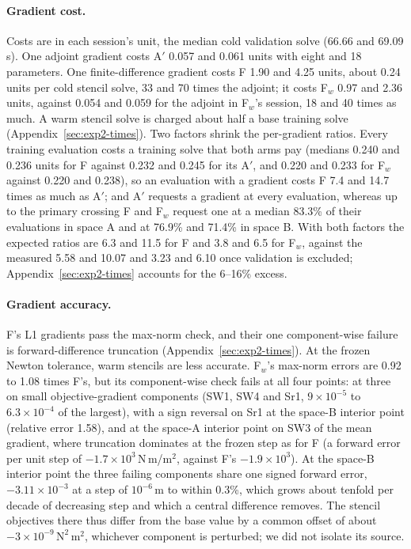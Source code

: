 \paragraph{Gradient cost.}
Costs are in each session's unit, the median cold validation solve (66.66
and 69.09\,s). One adjoint gradient costs A$'$ 0.057 and 0.061 units with
eight and 18 parameters. One finite-difference gradient costs F 1.90 and
4.25 units, about 0.24 units per cold stencil solve, 33 and 70 times the
adjoint; it costs F$_w$ 0.97 and 2.36 units, against 0.054 and 0.059 for
the adjoint in F$_w$'s session, 18 and 40 times as much. A warm
stencil solve is charged about half a base training solve
(Appendix~\ref{sec:exp2-times}). Two factors shrink the per-gradient ratios. Every training
evaluation costs a training solve that both arms pay (medians 0.240 and
0.236 units for F against 0.232 and 0.245 for its A$'$, and 0.220 and
0.233 for F$_w$ against 0.220 and 0.238), so an evaluation with a gradient
costs F 7.4 and 14.7 times as much as A$'$;
and A$'$ requests a gradient at every evaluation, whereas up to the primary
crossing F and F$_w$ request one at a median 83.3\% of their evaluations
in space A and at 76.9\% and 71.4\% in space B. With both factors the expected
ratios are 6.3 and 11.5 for F and 3.8 and 6.5 for F$_w$, against the
measured 5.58 and 10.07 and 3.23 and 6.10 once validation is excluded;
Appendix~\ref{sec:exp2-times} accounts for the 6--16\% excess.

\paragraph{Gradient accuracy.}
F's L1 gradients pass the max-norm check, and their one component-wise
failure is forward-difference truncation (Appendix~\ref{sec:exp2-times}).
At the frozen Newton tolerance, warm stencils
are less accurate. F$_w$'s max-norm errors are 0.92 to 1.08 times F's, but
its component-wise check fails at all four points: at three on small
objective-gradient components (SW1, SW4 and Sr1, $9\times10^{-5}$ to
$6.3\times10^{-4}$ of the largest), with a sign reversal on Sr1 at the
space-B interior point (relative error 1.58), and at the space-A interior
point on SW3 of the mean gradient, where truncation dominates at the frozen
step as for F (a forward error per unit step of
$-1.7\times10^{3}$\,N\,m/m$^2$, against F's $-1.9\times10^{3}$). At the
space-B interior point the three failing components share one signed
forward error, $-3.11\times10^{-3}$ at a step of $10^{-6}$\,m to within
0.3\%, which grows about tenfold per decade of decreasing step and which a
central difference removes. The stencil objectives there thus differ from
the base value by a common offset of about
$-3\times10^{-9}\,\mathrm{N^2\,m^2}$, whichever component is perturbed; we
did not isolate its source.

